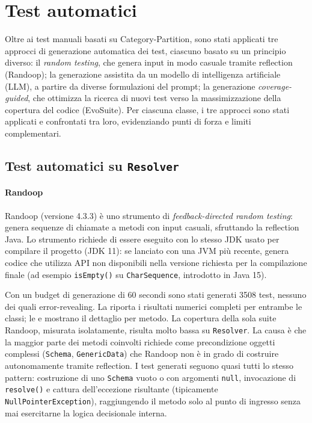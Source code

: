 \section{Test automatici}\label{sec:automatici}

Oltre ai test manuali basati su Category-Partition, sono stati
applicati tre approcci di generazione automatica dei test, ciascuno
basato su un principio diverso: il \emph{random testing}, che genera
input in modo casuale tramite reflection (Randoop); la generazione
assistita da un modello di intelligenza artificiale (LLM), a
partire da diverse formulazioni del prompt; la generazione
\emph{coverage-guided}, che ottimizza la ricerca di nuovi test verso
la massimizzazione della copertura del codice (EvoSuite). Per ciascuna
classe, i tre approcci sono stati applicati e confrontati tra loro,
evidenziando punti di forza e limiti complementari.
\subsection{Test automatici su \texttt{Resolver}}

\paragraph{Randoop}


Randoop (versione 4.3.3) è uno strumento di \emph{feedback-directed
random testing}: genera sequenze di chiamate a metodi con input
casuali, sfruttando la reflection Java. Lo strumento richiede di essere
eseguito con lo stesso JDK usato per compilare il progetto (JDK 11):
se lanciato con una JVM più recente, genera codice che utilizza API non
disponibili nella versione richiesta per la compilazione finale (ad
esempio \texttt{isEmpty()} su \texttt{CharSequence}, introdotto in
Java 15).

Con un budget di generazione di 60 secondi sono stati generati 3508
test, nessuno dei quali error-revealing. La  
riporta i risultati numerici completi
per entrambe le classi; le  e
 mostrano il dettaglio per metodo. La
copertura della sola suite Randoop, misurata isolatamente, risulta
molto bassa su \texttt{Resolver}. La causa è che la maggior parte dei
metodi coinvolti richiede come precondizione oggetti complessi
(\texttt{Schema}, \texttt{GenericData}) che Randoop non è in grado di
costruire autonomamente tramite reflection. I test generati seguono
quasi tutti lo stesso pattern: costruzione di uno \texttt{Schema}
vuoto o con argomenti \texttt{null}, invocazione di
\texttt{resolve()} e cattura dell'eccezione risultante (tipicamente
\texttt{NullPointerException}), raggiungendo il metodo solo al punto
di ingresso senza mai esercitarne la logica decisionale interna.

